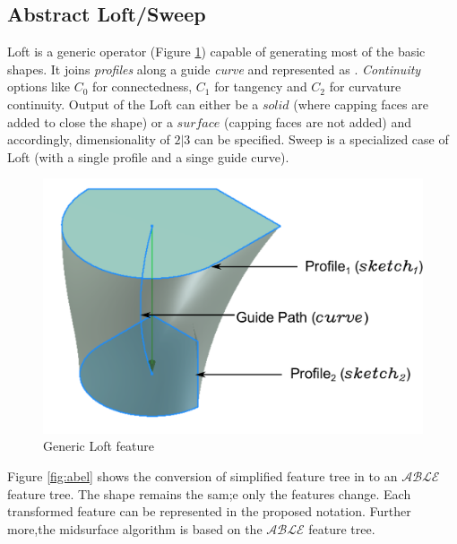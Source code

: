 \subsection{Abstract Loft/Sweep}

Loft is a generic operator (Figure \ref{figure_Loft})  capable of generating most of the basic shapes. It joins {\em profiles} along a guide {\em curve} and represented as .  {\em Continuity} options like $C_0$ for connectedness, $C_1$ for tangency and $C_2$ for curvature continuity. Output of the Loft can either be a $solid$ (where capping faces are added to close the shape) or a $surface$ (capping faces are not added) and accordingly, dimensionality of $2|3$ can be specified. Sweep is a specialized case of Loft (with a single profile and a singe guide curve).

\vspace{-0.5cm}

\begin{figure}[!htp]
	\centering
	\includegraphics[width=0.45\linewidth]{../Common/images//LoftPreview.pdf} 
	\caption{Generic Loft feature}
	\label{figure_Loft}
\end{figure}

\vspace{-0.5cm}

	

Figure \ref{fig:abel} shows the conversion of simplified feature tree in to an $\mathcal{ABLE}$ feature tree.  The shape remains the sam;e only the features change.
 Each transformed feature can be represented in the proposed notation. Further more,the midsurface algorithm is based on the $\mathcal{ABLE}$ feature tree.
 
